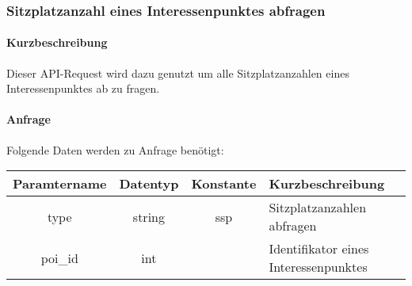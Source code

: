 \subsubsection{Sitzplatzanzahl eines Interessenpunktes abfragen}
\paragraph{Kurzbeschreibung}Dieser API-Request wird dazu genutzt um alle Sitzplatzanzahlen eines Interessenpunktes ab zu fragen.
\paragraph{Anfrage}Folgende Daten werden zu Anfrage benötigt:
\begin{table}[H]
	\begin{tabular}{|c|c|c|p{6.5cm}|}
		\hline
		\textbf{Paramtername} & \textbf{Datentyp} & \textbf{Konstante} & \textbf{Kurzbeschreibung}                                                                                               \\ \hline
		type                & string            & ssp                & Sitzplatzanzahlen abfragen \\ \hline
		poi\_id             & int               &                    & Identifikator eines Interessenpunktes \\ \hline
	\end{tabular}
\end{table}
